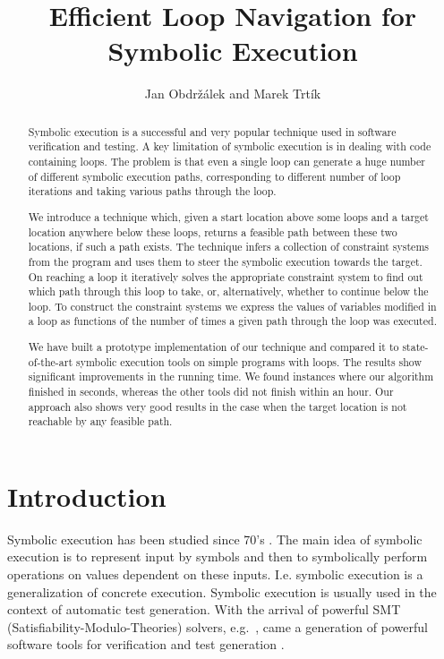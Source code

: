 \documentclass{llncs}
\begin{document}
\title{Efficient Loop Navigation for Symbolic Execution}

\author{Jan Obdr\v{z}\'alek and Marek Trt\'ik}


\maketitle

\begin{abstract}
  Symbolic execution is a successful and very popular technique used in
  software verification and testing. A key limitation of symbolic execution
  is in dealing with code containing loops. The problem is that even a
  single loop can generate a huge number of different symbolic execution
  paths, corresponding to different number of loop iterations and taking
  various paths through the loop.

We introduce a technique which, given
a start location above some loops and a target location anywhere below these
loops, returns a feasible path between these two locations, if such a path exists.  The
technique infers a collection of constraint systems from the program and
uses them to steer the symbolic execution towards the target. On reaching a
loop it iteratively solves the appropriate constraint system to find out
which path through this loop to take, or, alternatively, whether to continue
below the loop. To construct the constraint systems we express the values of
variables modified in a loop as functions of the number of times a given
path through the loop was executed.

We have built a prototype implementation of our technique and compared it to
state-of-the-art symbolic execution tools on simple programs with loops. The results show
significant improvements in the running time. We found
instances where our algorithm finished in seconds, whereas the other
tools did not finish within an hour. Our approach also
shows very good results in the case when the target location is not
reachable by any feasible path.
\end{abstract}

\section{Introduction}
Symbolic execution has been studied since 70's \cite{BEL75,Kin76}. The
main idea of symbolic execution is to represent input by symbols and then to
symbolically perform operations on values dependent on these
inputs. I.e. symbolic execution is a generalization of concrete
execution. Symbolic execution is usually used in the context of automatic
test generation.  With the arrival of powerful SMT
(Satisfiability-Modulo-Theories) solvers, e.g.~\cite{Z3,STP},
came a generation of powerful software tools for verification and test
generation \cite{TdH08,CDE08,NRTT09,SMA05}.
\end{document}

